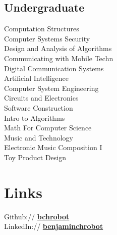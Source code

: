 \documentclass[letterpaper]{deedy-resume} %
\begin{document}
\begin{minipage}[t]{0.33\textwidth}



\subsection{Undergraduate}

Computation Structures \\					%
Computer Systems Security \\				%
Design and Analysis of Algorithms \\		%
Communicating with Mobile Techn \\			%
Digital Communication Systems \\			%
Artificial Intelligence \\					%
Computer System Engineering \\				%
Circuits and Electronics \\					%
Software Construction \\					%
Intro to Algorithms \\						%
Math For Computer Science \\				%
Music and Technology \\						%
Electronic Music Composition I \\			%
Toy Product Design 							%

\sectionspace %


\section{Links} 

Github:// \href{https://github.com/bchrobot}{\bf bchrobot} \\
LinkedIn:// \href{https://www.linkedin.com/in/benjaminchrobot/}{\bf benjaminchrobot} \\


\end{minipage}
\end{document}
